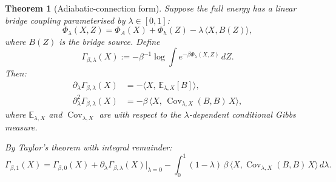 \documentclass[12pt]{article}
\theoremstyle{plain}
\newtheorem{theorem}{Theorem}[section]
\theoremstyle{definition}
\numberwithin{equation}{section}
\DeclareMathOperator{\Cov}{Cov}
\begin{document}
\begin{theorem}[Adiabatic-connection form]\label{thm:adiabatic}
Suppose the full energy has a \emph{linear bridge coupling}
parameterised by $\lambda\in[0,1]$:
\begin{equation}\label{eq:linearcoupling}
\Phi_\lambda(X,Z) = \Phi_A(X) + \Phi_h(Z)
- \lambda\,\langle X,B(Z)\rangle,
\end{equation}
where $B(Z)$ is the bridge source.  Define
\begin{equation}
\Gamma_{\beta,\lambda}(X)
:= -\beta^{-1}\log\int e^{-\beta\Phi_\lambda(X,Z)}\,dZ.
\end{equation}
Then:
\begin{align}
\partial_\lambda\Gamma_{\beta,\lambda}(X)
&= -\langle X,\,\mathbb{E}_{\lambda,X}[B]\rangle,
\label{eq:adiabatic1}\\
\partial_\lambda^2\Gamma_{\beta,\lambda}(X)
&= -\beta\,\langle X,\,\Cov_{\lambda,X}(B,B)\,X\rangle,
\label{eq:adiabatic2}
\end{align}
where $\mathbb{E}_{\lambda,X}$ and $\Cov_{\lambda,X}$ are with
respect to the $\lambda$-dependent conditional Gibbs measure.

By Taylor's theorem with integral remainder:
\begin{equation}\label{eq:adiabaticfull}
\boxed{\Gamma_{\beta,1}(X)
= \Gamma_{\beta,0}(X)
+ \partial_\lambda\Gamma_{\beta,\lambda}(X)\big|_{\lambda=0}
- \int_0^1(1-\lambda)\,\beta\,
\langle X,\Cov_{\lambda,X}(B,B)\,X\rangle\,d\lambda.}
\end{equation}
\end{theorem}
\end{document}
